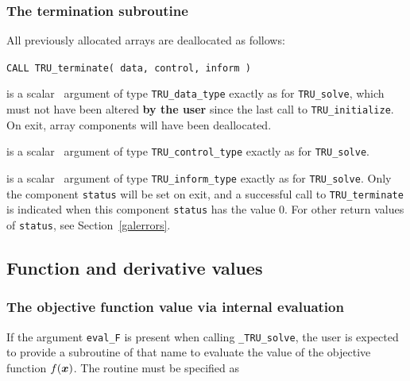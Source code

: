 \documentclass{galahad}
\newcommand{\packagename}{TRU}
\newcommand{\fullpackagename}{\libraryname\_\packagename}
\newcommand{\solver}{{\tt \fullpackagename\_solve}}
\begin{document}

\subsubsection{The  termination subroutine}
All previously allocated arrays are deallocated as follows:
\vspace*{1mm}

\hspace{8mm}
{\tt CALL \packagename\_terminate( data, control, inform )}

\vspace*{-1mm}
\begin{description}

 is a scalar \intentinout\ argument of type
{\tt \packagename\_data\_type}
exactly as for
{\tt \packagename\_solve},
which must not have been altered {\bf by the user} since the last call to
{\tt \packagename\_initialize}.
On exit, array components will have been deallocated.

 is a scalar \intentin\ argument of type
{\tt \packagename\_control\_type}
exactly as for
{\tt \packagename\_solve}.

 is a scalar \intentout\ argument of type
{\tt \packagename\_inform\_type}
exactly as for
{\tt \packagename\_solve}.
Only the component {\tt status} will be set on exit, and a
successful call to
{\tt \packagename\_terminate}
is indicated when this  component {\tt status} has the value 0.
For other return values of {\tt status}, see Section~\ref{galerrors}.

\end{description}


\subsection{Function and derivative values\label{fdv}}


\subsubsection{The objective function value via internal evaluation\label{ffv}}

If the argument {\tt eval\_F} is present when calling \solver, the
user is expected to provide a subroutine of that name to evaluate the
value of the objective function $f({\bm{x}})$.
The routine must be specified as
\end{document}
